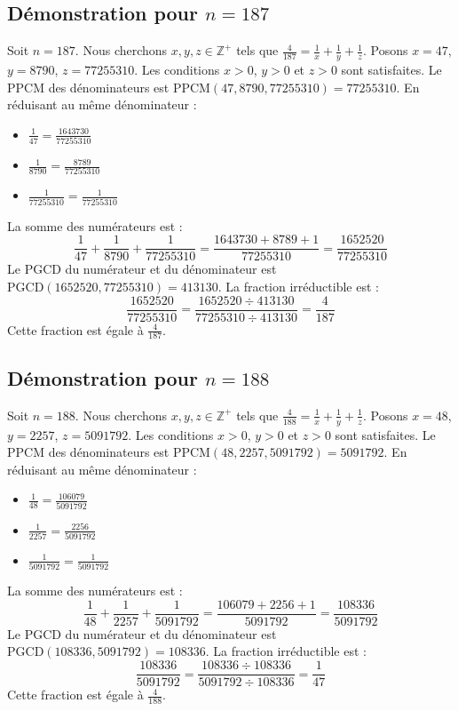 \documentclass[11pt,a4paper]{article}
\begin{document}
\subsection{Démonstration pour $n = 187$}
Soit $n = 187$. Nous cherchons $x, y, z \in \mathbb{Z}^{+}$ tels que $\frac{4}{187} = \frac{1}{x} + \frac{1}{y} + \frac{1}{z}$.
Posons $x = 47$, $y = 8790$, $z = 77255310$.
Les conditions $x > 0$, $y > 0$ et $z > 0$ sont satisfaites.
Le PPCM des dénominateurs est $\text{PPCM}(47, 8790, 77255310) = 77255310$.
En réduisant au même dénominateur :
\begin{itemize}
    \item $\frac{1}{47} = \frac{1643730}{77255310}$
    \item $\frac{1}{8790} = \frac{8789}{77255310}$
    \item $\frac{1}{77255310} = \frac{1}{77255310}$
\end{itemize}
La somme des numérateurs est :
$$ \frac{1}{47} + \frac{1}{8790} + \frac{1}{77255310} = \frac{1643730 + 8789 + 1}{77255310} = \frac{1652520}{77255310} $$
Le PGCD du numérateur et du dénominateur est $\text{PGCD}(1652520, 77255310) = 413130$.
La fraction irréductible est :
$$ \frac{1652520}{77255310} = \frac{1652520 \div 413130}{77255310 \div 413130} = \frac{4}{187} $$
Cette fraction est égale à $\frac{4}{187}$.

\subsection{Démonstration pour $n = 188$}
Soit $n = 188$. Nous cherchons $x, y, z \in \mathbb{Z}^{+}$ tels que $\frac{4}{188} = \frac{1}{x} + \frac{1}{y} + \frac{1}{z}$.
Posons $x = 48$, $y = 2257$, $z = 5091792$.
Les conditions $x > 0$, $y > 0$ et $z > 0$ sont satisfaites.
Le PPCM des dénominateurs est $\text{PPCM}(48, 2257, 5091792) = 5091792$.
En réduisant au même dénominateur :
\begin{itemize}
    \item $\frac{1}{48} = \frac{106079}{5091792}$
    \item $\frac{1}{2257} = \frac{2256}{5091792}$
    \item $\frac{1}{5091792} = \frac{1}{5091792}$
\end{itemize}
La somme des numérateurs est :
$$ \frac{1}{48} + \frac{1}{2257} + \frac{1}{5091792} = \frac{106079 + 2256 + 1}{5091792} = \frac{108336}{5091792} $$
Le PGCD du numérateur et du dénominateur est $\text{PGCD}(108336, 5091792) = 108336$.
La fraction irréductible est :
$$ \frac{108336}{5091792} = \frac{108336 \div 108336}{5091792 \div 108336} = \frac{1}{47} $$
Cette fraction est égale à $\frac{4}{188}$.
\end{document}
